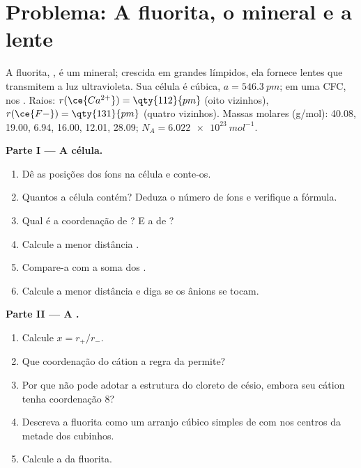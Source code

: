 \section{Problema: A fluorita, o mineral e a lente}

\begin{problem}
\label{pb:b1:crystals-ionic-covalent:1}
A fluorita, , é um mineral; crescida em grandes 
límpidos, ela fornece lentes que transmitem a luz ultravioleta. Sua
célula é cúbica, $a =
\qty{546.3}{pm}$;  em uma  CFC,  nos . Raios: $r(\ce{Ca^{2+}}) = \qty{112}{pm}$ (oito
vizinhos), $r(\ce{F-}) = \qty{131}{pm}$ (quatro vizinhos). Massas molares
(g/mol):  40.08,  19.00,  6.94,  16.00, 
12.01,  28.09; $N_A = \qty{6.022e23}{mol^{-1}}$.

\medskip
\noindent\textbf{Parte I --- A célula.}
\begin{enumerate}
  \item Dê as posições dos íons  na célula e conte-os.
  \item Quantos  a célula contém? Deduza o número de
        íons  e verifique a fórmula.
  \item Qual é a coordenação de ? E a de ?
  \item Calcule a menor distância .
  \item Compare-a com a soma dos .
  \item Calcule a menor distância  e diga se os ânions se tocam.
\end{enumerate}

\medskip
\noindent\textbf{Parte II --- A .}
\begin{enumerate}[resume]
  \item Calcule $x = r_+/r_-$.
  \item Que coordenação do cátion a regra da  permite?
  \item Por que  não pode adotar a estrutura do cloreto de césio,
        embora seu cátion tenha coordenação 8?
  \item Descreva a fluorita como um arranjo cúbico simples de  com
         nos centros da metade dos cubinhos.
  \item Calcule a  da fluorita.
\end{enumerate}


\end{problem}
